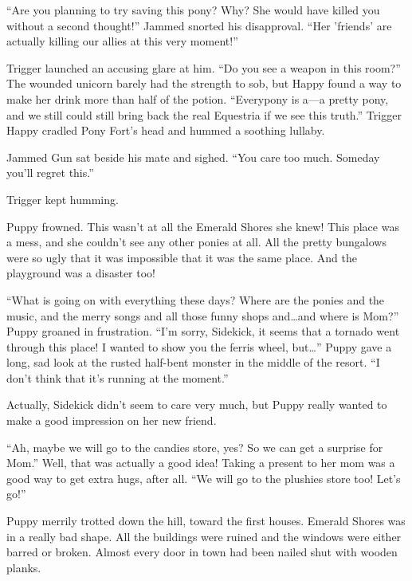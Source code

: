 ``Are you planning to try saving this pony? Why? She would have killed you without a second thought!'' Jammed snorted his disapproval. ``Her 'friends' are actually killing our allies at this very moment!''

Trigger launched an accusing glare at him. ``Do you see a weapon in this room?'' The wounded unicorn barely had the strength to sob, but Happy found a way to make her drink more than half of the potion. ``Everypony is a---a pretty pony, and we still could still bring back the real Equestria if we see this truth.'' Trigger Happy cradled Pony Fort's head and hummed a soothing lullaby.

Jammed Gun sat beside his mate and sighed. ``You care too much. Someday you'll regret this.''

Trigger kept humming.



\horizonline


Puppy frowned. This wasn't at all the Emerald Shores she knew! This place was a mess, and she couldn't see any other ponies at all. All the pretty bungalows were so ugly that it was impossible that it was the same place. And the playground was a disaster too!

``What is going on with everything these days? Where are the ponies and the music, and the merry songs and all those funny shops and\dots and where is Mom?'' Puppy groaned in frustration. ``I'm sorry, Sidekick, it seems that a tornado went through this place! I wanted to show you the ferris wheel, but\dots'' Puppy gave a long, sad look at the rusted half-bent monster in the middle of the resort. ``I don't think that it's running at the moment.''

Actually, Sidekick didn't seem to care very much, but Puppy really wanted to make a good impression on her new friend.

``Ah, maybe we will go to the candies store, yes? So we can get a surprise for Mom.'' Well, that was actually a good idea! Taking a present to her mom was a good way to get extra hugs, after all. ``We will go to the plushies store too! Let's go!''

Puppy merrily trotted down the hill, toward the first houses. Emerald Shores was in a really bad shape. All the buildings were ruined and the windows were either barred or broken. Almost every door in town had been nailed shut with wooden planks.

